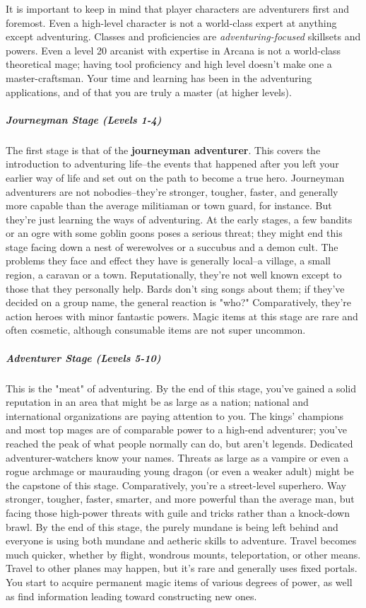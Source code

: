 It is important to keep in mind that player characters are adventurers first and foremost. Even a high-level character is not a world-class expert at anything except adventuring. Classes and proficiencies are \textit{adventuring-focused} skillsets and powers. Even a level 20 arcanist with expertise in Arcana is not a world-class theoretical mage; having tool proficiency and high level doesn't make one a master-craftsman. Your time and learning has been in the adventuring applications, and of that you are truly a master (at higher levels).

\subparagraph*{Journeyman Stage (Levels 1-4)}
The first stage is that of the \textbf{journeyman adventurer}. This covers the introduction to adventuring life--the events that happened after you left your earlier way of life and set out on the path to become a true hero. Journeyman adventurers are not nobodies--they're stronger, tougher, faster, and generally more capable than the average militiaman or town guard, for instance. But they're just learning the ways of adventuring. At the early stages, a few bandits or an ogre with some goblin goons poses a serious threat; they might end this stage facing down a nest of werewolves or a succubus and a demon cult. The problems they face and effect they have is generally local--a village, a small region, a caravan or a town. Reputationally, they're not well known except to those that they personally help. Bards don't sing songs about them; if they've decided on a group name, the general reaction is "who?" Comparatively, they're action heroes with minor fantastic powers. Magic items at this stage are rare and often cosmetic, although consumable items are not super uncommon.

\subparagraph*{Adventurer Stage (Levels 5-10)}
This is the "meat" of adventuring. By the end of this stage, you've gained a solid reputation in an area that might be as large as a nation; national and international organizations are paying attention to you. The kings' champions and most top mages are of comparable power to a high-end adventurer; you've reached the peak of what people normally can do, but aren't legends. Dedicated adventurer-watchers know your names. Threats as large as a vampire or even a rogue archmage or maurauding young dragon (or even a weaker adult) might be the capstone of this stage. Comparatively, you're a street-level superhero. Way stronger, tougher, faster, smarter, and more powerful than the average man, but facing those high-power threats with guile and tricks rather than a knock-down brawl. By the end of this stage, the purely mundane is being left behind and everyone is using both mundane and aetheric skills to adventure. Travel becomes much quicker, whether by flight, wondrous mounts, teleportation, or other means. Travel to other planes may happen, but it's rare and generally uses fixed portals. You start to acquire permanent magic items of various degrees of power, as well as find information leading toward constructing new ones. 


